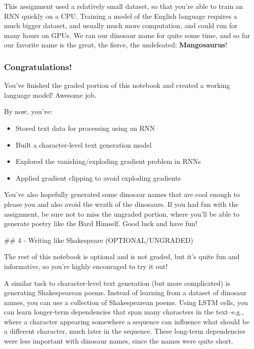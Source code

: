 \documentclass[11pt]{article}
\providecommand{\tightlist}{%
      \setlength{\itemsep}{0pt}\setlength{\parskip}{0pt}}
\begin{document}
This assignment used a relatively small dataset, so that you're able to
train an RNN quickly on a CPU. Training a model of the English language
requires a much bigger dataset, and usually much more computation, and
could run for many hours on GPUs. We ran our dinosaur name for quite
some time, and so far our favorite name is the great, the fierce, the
undefeated: \textbf{Mangosaurus}!

    \hypertarget{congratulations}{%
\subsubsection{Congratulations!}\label{congratulations}}

You've finished the graded portion of this notebook and created a
working language model! Awesome job.

By now, you've:

\begin{itemize}
\tightlist
\item
  Stored text data for processing using an RNN
\item
  Built a character-level text generation model
\item
  Explored the vanishing/exploding gradient problem in RNNs
\item
  Applied gradient clipping to avoid exploding gradients
\end{itemize}

You've also hopefully generated some dinosaur names that are cool enough
to please you and also avoid the wrath of the dinosaurs. If you had fun
with the assignment, be sure not to miss the ungraded portion, where
you'll be able to generate poetry like the Bard Himself. Good luck and
have fun!

    \#\# 4 - Writing like Shakespeare (OPTIONAL/UNGRADED)

The rest of this notebook is optional and is not graded, but it's quite
fun and informative, so you're highly encouraged to try it out!

A similar task to character-level text generation (but more complicated)
is generating Shakespearean poems. Instead of learning from a dataset of
dinosaur names, you can use a collection of Shakespearean poems. Using
LSTM cells, you can learn longer-term dependencies that span many
characters in the text--e.g., where a character appearing somewhere a
sequence can influence what should be a different character, much later
in the sequence. These long-term dependencies were less important with
dinosaur names, since the names were quite short.
\end{document}
